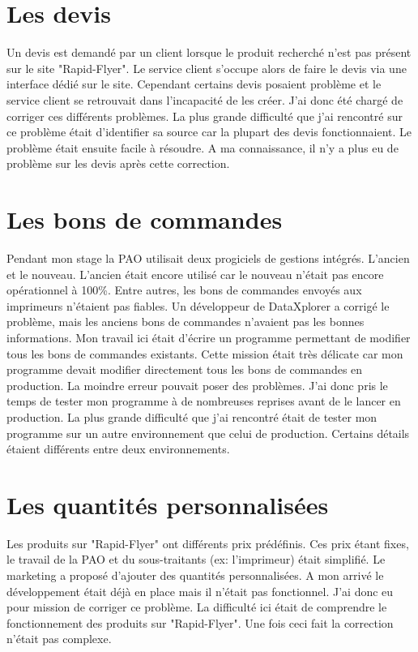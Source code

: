 \section{Les devis}
Un devis est demandé par un client lorsque le produit recherché n'est pas présent sur le site "Rapid-Flyer". Le service client s'occupe alors de faire le devis via une interface dédié sur le site. Cependant certains devis posaient problème et le service client se retrouvait dans l'incapacité de les créer.\newline
J'ai donc été chargé de corriger ces différents problèmes. La plus grande difficulté que j'ai rencontré sur ce problème était d'identifier sa source car la plupart des devis fonctionnaient. Le problème était ensuite facile à résoudre. A ma connaissance, il n'y a plus eu de problème sur les devis après cette correction.

\section{Les bons de commandes}
Pendant mon stage la PAO utilisait deux progiciels de gestions intégrés. L'ancien et le nouveau. L'ancien était encore utilisé car le nouveau n'était pas encore opérationnel à 100\%. Entre autres, les bons de commandes envoyés aux imprimeurs n'étaient pas fiables. Un développeur de DataXplorer a corrigé le problème, mais les anciens bons de commandes n'avaient pas les bonnes informations. Mon travail ici était d'écrire un programme permettant de modifier tous les bons de commandes existants. Cette mission était très délicate car mon programme devait modifier directement tous les bons de commandes en production. La moindre erreur pouvait poser des problèmes. J'ai donc pris le temps de tester mon programme à de nombreuses reprises avant de le lancer en production. La plus grande difficulté que j'ai rencontré était de tester mon programme sur un autre environnement que celui de production. Certains détails étaient différents entre deux environnements.

\section{Les quantités personnalisées}
Les produits sur "Rapid-Flyer" ont différents prix prédéfinis. Ces prix étant fixes, le travail de la PAO et du sous-traitants (ex: l'imprimeur) était simplifié.\newline
Le marketing a proposé d'ajouter des quantités personnalisées. A mon arrivé le développement était déjà en place mais il n'était pas fonctionnel. J'ai donc eu pour mission de corriger ce problème. La difficulté ici était de comprendre le fonctionnement des produits sur "Rapid-Flyer". Une fois ceci fait la correction n'était pas complexe.

